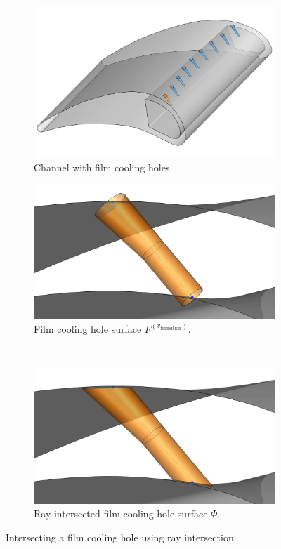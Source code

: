 \documentclass[a4paper, 11pt]{report}
\theoremstyle{definition}
\begin{document}
	\begin{figure}[H]
		\centering
		\begin{subfigure}{.4\textwidth}
			\includegraphics[width=\textwidth]{../tec/holes/22edit.png}
			\caption{Channel with film cooling holes.}
		\end{subfigure}
		\phantom{aaaaaaaaaa}
		\begin{subfigure}{.4\textwidth}
			\includegraphics[width=\textwidth]{../tec/holes/20edit.png}
			\caption{Film cooling hole surface $F^{(v_\textrm{transition})}$.}
		\end{subfigure}\\
		\begin{subfigure}{.5\textwidth}
			\includegraphics[width=\textwidth]{../tec/holes/21edit.png}
			\caption{Ray intersected film cooling hole surface $\Phi$.}
		\end{subfigure}
		\caption{Intersecting a film cooling hole using ray intersection.}
		\label{fig:filmholeintersection}
	\end{figure}
\end{document}
